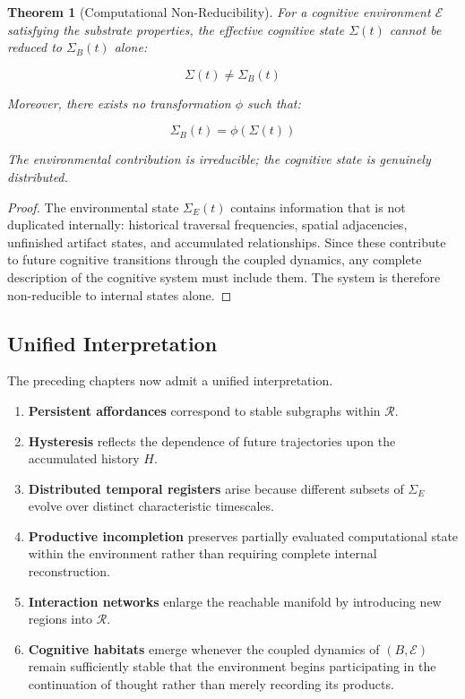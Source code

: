 \documentclass[12pt,oneside]{article}
\newtheorem{theorem}[definition]{Theorem}
\theoremstyle{remark}
\begin{document}
\begin{theorem}[Computational Non-Reducibility]
For a cognitive environment \(\mathcal{E}\) satisfying the substrate properties, the effective cognitive state \(\Sigma(t)\) cannot be reduced to \(\Sigma_B(t)\) alone:

\[
\Sigma(t) \neq \Sigma_B(t)
\]

Moreover, there exists no transformation \(\phi\) such that:

\[
\Sigma_B(t) = \phi(\Sigma(t))
\]

The environmental contribution is irreducible; the cognitive state is genuinely distributed.
\end{theorem}

\begin{proof}
The environmental state \(\Sigma_E(t)\) contains information that is not duplicated internally: historical traversal frequencies, spatial adjacencies, unfinished artifact states, and accumulated relationships. Since these contribute to future cognitive transitions through the coupled dynamics, any complete description of the cognitive system must include them. The system is therefore non-reducible to internal states alone.
\end{proof}

\subsection{Unified Interpretation}

The preceding chapters now admit a unified interpretation.

\begin{enumerate}
\item \textbf{Persistent affordances} correspond to stable subgraphs within \(\mathcal{R}\).
\item \textbf{Hysteresis} reflects the dependence of future trajectories upon the accumulated history \(H\).
\item \textbf{Distributed temporal registers} arise because different subsets of \(\Sigma_E\) evolve over distinct characteristic timescales.
\item \textbf{Productive incompletion} preserves partially evaluated computational state within the environment rather than requiring complete internal reconstruction.
\item \textbf{Interaction networks} enlarge the reachable manifold by introducing new regions into \(\mathcal{R}\).
\item \textbf{Cognitive habitats} emerge whenever the coupled dynamics of \((B, \mathcal{E})\) remain sufficiently stable that the environment begins participating in the continuation of thought rather than merely recording its products.
\end{enumerate}
\end{document}
